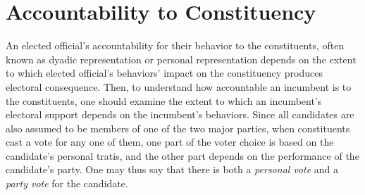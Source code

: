 \documentclass{article}
\begin{document}
%		
%		
		
		
	\section*{Accountability to Constituency}
		
		An elected official's accountability for their behavior
		to the constituents,
		often known as dyadic representation
		\autocites
		[][]
		{millerConstituencyInfluenceCongress1963}
		{weissbergCollectiveVsDyadic1978}
		{ansolabehereDyadicRepresentation2011}
		or personal representation
		\autocites
		[][]
		{colomerPersonalRepresentationNeglected2011}
		depends on
		the extent to which elected official's behaviors' impact on the constituency
		produces electoral consequence.
		Then,
		to understand how accountable an incumbent is to the constituents,
		one should examine
		the extent to which an incumbent's electoral support depends on the incumbent's behaviors.
		Since all candidates are also
		assumed to be
		members of one of the two major parties,
		when constituents cast a vote for any one of them,
		one part of the voter choice is based on the candidate's personal tratis,
		and the other part depends on the performance of the candidate's party. 
		One may thus say that there is both
		a \textit{personal vote}
		and a \textit{party vote} for the candidate.
	
\end{document}
